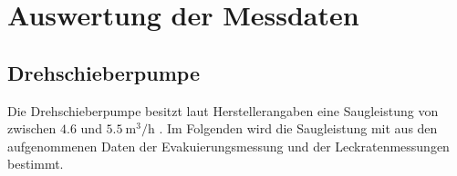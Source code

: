 \section{Auswertung der Messdaten}
\label{sec:Auswertung}
\subsection{Drehschieberpumpe}
Die Drehschieberpumpe besitzt laut Herstellerangaben eine Saugleistung von zwischen 
$\num{4.6}$ und $\SI{5.5}{\cubic\metre\per\hour}$ \cite{Versuchsbeschreibung}.
Im Folgenden wird die Saugleistung mit aus den aufgenommenen Daten der Evakuierungsmessung
und der Leckratenmessungen bestimmt. 
